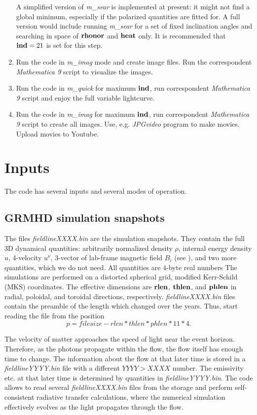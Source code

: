 \documentclass{emulateapj}
\newcommand{\mat}{\textit{Mathematica 9 }}
\begin{document}
\begin{enumerate}
{A simplified version of \textit{m\_sear} is implemented at present: it might not find a global minimum, especially if the polarized quantities are fitted for.
A full version would include running \textit{m\_sear} for a set of fixed inclination angles and searching in space of $\bf rhonor$ and $\bf heat$ only.
It is recommended that ${\bf ind}=21$ is set for this step.}
\item{Run the code in \textit{m\_imag} mode and create image files. Run the correspondent \mat script to visualize the images.}
\item{Run the code in \textit{m\_quick} for maximum $\bf ind$, run correspondent \mat script and enjoy the full variable lightcurve.}
\item{Run the code in \textit{m\_imag} for maximum $\bf ind$, run correspondent \mat script to create all images. Use, e.g. \textit{JPGvideo} program to make movies.
Upload movies to Youtube.}
\end{enumerate}

\section{Inputs}
The code has several inputs and several modes of operation.
\subsection{GRMHD simulation snapshots}
The files \textit{fieldlineXXXX.bin} are the simulation snapshots. They contain the full 3D dynamical quantities: arbitrarily normalized density $\rho$, internal energy density $u$,
4-velocity $u^\nu$, 3-vector of lab-frame magnetic field $B_i$ (see \citealt{Penna:2010dj}), and two more quantities, which we do not need. All quantities are 4-byte real numbers
The simulations are performed on a distorted spherical grid, modified Kerr-Schild (MKS) coordinates. The effective dimensions are ${\bf rlen}$, ${\bf thlen}$, and ${\bf phlen}$
in radial, poloidal, and toroidal directions, respectively. \textit{fieldlineXXXX.bin} files contain the preamble of the length which changed over the years.
Thus, start reading the file from the position
\begin{equation}
p=filesize-rlen*thlen*phlen*11*4.
\end{equation}

The velocity of matter approaches the speed of light near the event horizon. Therefore, as the photons propagate within the flow, the flow itself has enough time to change.
The information about the flow at that later time is stored in a \textit{fieldlineYYYY.bin} file with a different $YYYY>XXXX$ number. The emissivity etc.
at that later time is determined by quantities in \textit{fieldlineYYYY.bin}. The code allows to read several \textit{fieldlineXXXX.bin} files from the storage
and perform self-consistent radiative transfer calculations, where the numerical simulation effectively evolves as the light propagates through the flow.
\end{document}

